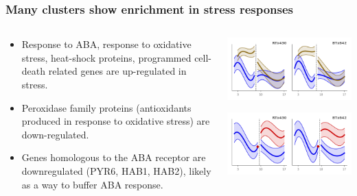 \documentclass[xcolor=dvipsnames]{beamer}
\begin{document}
\begin{frame}
\frametitle{Many clusters show enrichment in stress responses}
\begin{columns}
\begin{column}{0.7\linewidth}
\begin{itemize}[label={$\bullet$}]
\item Response to ABA, response to oxidative stress, heat-shock proteins, programmed
cell-death related genes are up-regulated in stress.
\item Peroxidase family proteins (antioxidants produced in response to
oxidative stress) are down-regulated.
\item Genes homologous to the ABA receptor are downregulated (PYR6, HAB1, HAB2),
likely as a way to buffer ABA response.
\end{itemize}
\end{column}
\begin{column}{0.3\linewidth}
\includegraphics[width=\linewidth]{figures/clusters/root_Preflowering_14.png}

\includegraphics[width=\linewidth]{figures/clusters/root_Postflowering_0.png}
\end{column}
\end{columns}
\end{frame}
\end{document}
